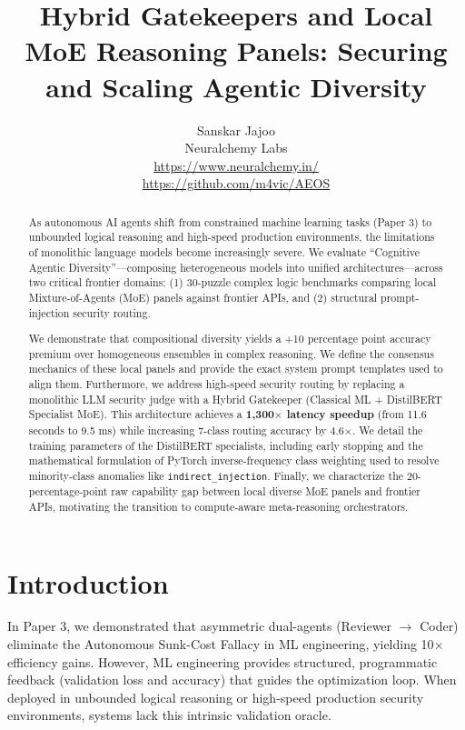 \documentclass[11pt,a4paper]{article}
\title{Hybrid Gatekeepers and Local MoE Reasoning Panels: Securing and Scaling Agentic Diversity}
\author{Sanskar Jajoo \\ Neuralchemy Labs \\ \url{https://www.neuralchemy.in/} \\ \url{https://github.com/m4vic/AEOS}}
\date{}
\begin{document}
\maketitle

\begin{abstract}
As autonomous AI agents shift from constrained machine learning tasks (Paper 3) to unbounded logical reasoning and high-speed production environments, the limitations of monolithic language models become increasingly severe. We evaluate ``Cognitive Agentic Diversity''---composing heterogeneous models into unified architectures---across two critical frontier domains: (1) 30-puzzle complex logic benchmarks comparing local Mixture-of-Agents (MoE) panels against frontier APIs, and (2) structural prompt-injection security routing.

We demonstrate that compositional diversity yields a +10 percentage point accuracy premium over homogeneous ensembles in complex reasoning. We define the consensus mechanics of these local panels and provide the exact system prompt templates used to align them. Furthermore, we address high-speed security routing by replacing a monolithic LLM security judge with a Hybrid Gatekeeper (Classical ML + DistilBERT Specialist MoE). This architecture achieves a \textbf{1,300$\times$ latency speedup} (from 11.6 seconds to 9.5 ms) while increasing 7-class routing accuracy by 4.6$\times$. We detail the training parameters of the DistilBERT specialists, including early stopping and the mathematical formulation of PyTorch inverse-frequency class weighting used to resolve minority-class anomalies like \texttt{indirect\_injection}. Finally, we characterize the 20-percentage-point raw capability gap between local diverse MoE panels and frontier APIs, motivating the transition to compute-aware meta-reasoning orchestrators.
\end{abstract}

\section{Introduction}

In Paper 3, we demonstrated that asymmetric dual-agents (Reviewer $\rightarrow$ Coder) eliminate the Autonomous Sunk-Cost Fallacy in ML engineering, yielding 10$\times$ efficiency gains. However, ML engineering provides structured, programmatic feedback (validation loss and accuracy) that guides the optimization loop. When deployed in unbounded logical reasoning or high-speed production security environments, systems lack this intrinsic validation oracle.
\end{document}
